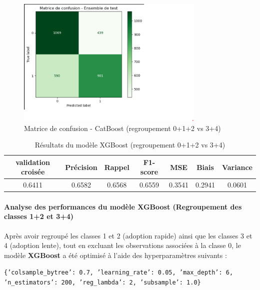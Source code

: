 \documentclass[a4paper,12pt]{article}
\begin{document}
 
\begin{figure}[H]
    \centering
    \includegraphics[width=0.8\textwidth]{xgboost0.png}
    \caption{Matrice de confusion - CatBoost (regroupement 0+1+2 vs 3+4)}
    \label{fig:catboost012_conf}
\end{figure}
 
 
 
\begin{table}[h]
\centering
\begin{tabular}{|c|c|c|c|c|c|c|}
\hline
\textbf{validation croisée} & \textbf{Précision} & \textbf{Rappel} & \textbf{F1-score} & \textbf{MSE} & \textbf{Biais} & \textbf{Variance} \\
\hline
0.6411& 0.6582 & 0.6568 & 0.6559 & 0.3541&  0.2941 &  0.0601 \\
\hline
\end{tabular}
\caption{Résultats du modèle XGBoost (regroupement 0+1+2 vs 3+4)}
\end{table}
 
\paragraph{Analyse des performances du modèle XGBoost (Regroupement des classes 1+2 et 3+4)}

Après avoir regroupé les classes 1 et 2 (adoption rapide) ainsi que les classes 3 et 4 (adoption lente), tout en excluant les observations associées à la classe 0, le modèle \textbf{XGBoost} a été optimisé à l’aide des hyperparamètres suivants :
 
\begin{center}

\texttt{\{'colsample\_bytree': 0.7, 'learning\_rate': 0.05, 'max\_depth': 6, 'n\_estimators': 200, 'reg\_lambda': 2, 'subsample': 1.0\}}

\end{center}
 
\end{document}
